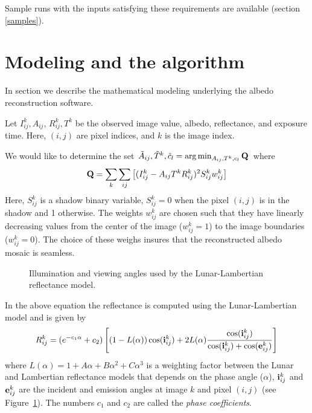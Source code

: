 \documentclass[letterpaper,fleqn,11pt]{report}
\begin{document}
Sample runs with the inputs satisfying these requirements are available (section \ref{samples}).

\section{Modeling and the algorithm}\label{algorithm}

In section we describe the mathematical modeling underlying the albedo reconstruction software.

Let $I^k_{ij}, A_{ij}$, $R^k_{ij}, T^k$ be the
observed image value, albedo, reflectance, and exposure time. Here, $(i,j)$ are pixel indices, and $k$ is the
image index.

We would like to determine the set ${\tilde{A}_{ij}, \tilde{T}^k},
\tilde{c}_l = \arg \min_{A_{ij}, T^k, c_l} {\bf Q}$  where
\begin{eqnarray}
{\bf Q} = \sum_k\sum_{ij}\left[(I^k_{ij}-A_{ij}T^kR^k_{ij})^2 S^k_{ij}w^k_{ij}\right]
\label{cost_function}
\end {eqnarray}
Here,  $S^k_{ij}$ is a shadow binary variable, $S^k_{ij} =
0$ when the pixel $(i, j)$ is in the shadow and 1 otherwise. The weights
$w^k_{ij}$ are chosen such that they have linearly decreasing values
from the center of the image ($w^k_{ij} = 1$) to the image boundaries
($w^k_{ij} = 0$). The choice of these weighs insures that the
reconstructed albedo mosaic is seamless. 

\begin{figure}[ht]
\centerline{}
\caption{Illumination and viewing angles used by the Lunar-Lambertian reflectance model.}
\label{fig:angles}
\end{figure}

In the above equation the reflectance is computed using the Lunar-Lambertian model and is given by
\begin{eqnarray}
R^k_{ij} = (e^{-c_1\alpha} + c_2)\left[ (1-L(\alpha))\cos({\bf i}_{ij}^k)
  +2L(\alpha)\frac{\cos({\bf i}_{ij}^k)}{\cos({\bf i}_{ij}^k) +
    \cos({\bf e}_{ij}^k)} \right]
\label{reflectance}
\end {eqnarray}
where $L(\alpha) = 1 + A\alpha + B\alpha^2 + C\alpha^3$ is a weighting factor between the Lunar and Lambertian reflectance models that depends on the phase angle ($\alpha$), ${\bf i}_{ij}^k$ and ${\bf e}_{ij}^k$
are the incident and emission angles at image $k$ and pixel
$(i,j)$ (see Figure~\ref{fig:angles}). The numbers $c_1$ and $c_2$ are called the {\it phase coefficients}.
\end{document}
